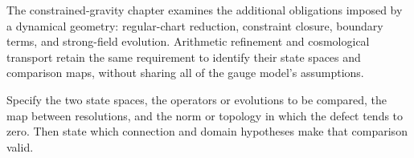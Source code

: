 The constrained-gravity chapter examines the additional obligations imposed by a dynamical geometry: regular-chart reduction, constraint closure, boundary terms, and strong-field evolution. Arithmetic refinement and cosmological transport retain the same requirement to identify their state spaces and comparison maps, without sharing all of the gauge model's assumptions.

\begin{readerroadmap}[title={The next theorem should name its comparison}]
Specify the two state spaces, the operators or evolutions to be compared, the map between resolutions, and the norm or topology in which the defect tends to zero. Then state which connection and domain hypotheses make that comparison valid.
\end{readerroadmap}

